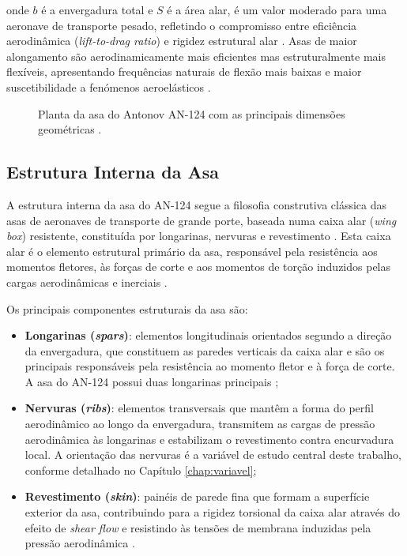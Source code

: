 \documentclass[11pt,twoside,a4paper]{report}
\begin{document}
\noindent onde $b$ é a envergadura total e $S$ é a área alar, é um valor moderado para uma aeronave de transporte pesado, refletindo o compromisso entre eficiência aerodinâmica (\textit{lift-to-drag ratio}) e rigidez estrutural alar \cite{Raymer2018}. Asas de maior alongamento são aerodinamicamente mais eficientes mas estruturalmente mais flexíveis, apresentando frequências naturais de flexão mais baixas e maior suscetibilidade a fenómenos aeroelásticos \cite{Wright2015}.

\begin{figure}[h!]
    \centering
    \caption{Planta da asa do Antonov AN-124 com as principais 
    dimensões geométricas \cite{GarciaFernandez2025}.}
    \label{fig:an124_asa_planta}
\end{figure}

\subsection{Estrutura Interna da Asa}

A estrutura interna da asa do AN-124 segue a filosofia construtiva clássica das asas de aeronaves de transporte de grande porte, baseada numa caixa alar (\textit{wing box}) resistente, constituída por longarinas, nervuras e revestimento \cite{Niu1988, Megson2012}. Esta caixa alar é o elemento estrutural primário da asa, responsável pela resistência aos momentos fletores, às forças de corte e aos momentos de torção induzidos pelas cargas aerodinâmicas e inerciais \cite{Megson2012}.

Os principais componentes estruturais da asa são:

\begin{itemize}
    \item \textbf{Longarinas (\textit{spars})}: elementos longitudinais orientados segundo a direção da envergadura, que constituem as paredes verticais da caixa alar e são os principais responsáveis pela resistência ao momento fletor e à força de corte. A asa do AN-124 possui duas longarinas principais \cite{GarciaFernandez2025};

    \item \textbf{Nervuras (\textit{ribs})}: elementos transversais que mantêm a forma do perfil aerodinâmico ao longo da envergadura, transmitem as cargas de pressão aerodinâmica às longarinas e estabilizam o revestimento contra encurvadura local. A orientação das nervuras é a variável de estudo central deste trabalho, conforme detalhado no Capítulo \ref{chap:variavel};

    \item \textbf{Revestimento (\textit{skin})}: painéis de parede fina que formam a superfície exterior da asa, contribuindo para a rigidez torsional da caixa alar através do efeito de \textit{shear flow} e resistindo às tensões de membrana induzidas pela pressão aerodinâmica \cite{Megson2012}.
\end{itemize}
\end{document}
